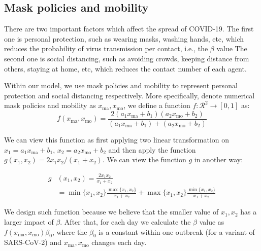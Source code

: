 \subsection{Mask policies and mobility}
There are two important factors which affect the spread of COVID-19. The first one is personal protection, such as wearing masks, washing hands, etc, which reduces the probability of virus transmission per contact, i.e., the $\beta$ value The second one is social distancing, such as avoiding crowds, keeping distance from others, staying at home, etc, which reduces the contact number of each agent.

Within our model, we use mask policies and mobility to represent personal protection and social distancing respectively. More specifically, denote numerical mask policies and mobility as $x_{\text{ma}},x_{\text{mo}}$, we define a function $f:\mathcal{R}^2\rightarrow[0,1]$ as:
\begin{equation}
	f(x_{\text{ma}},x_{\text{mo}})=\frac{2(a_1x_{\text{ma}}+b_1)(a_2x_{\text{mo}}+b_2)}{(a_1x_{\text{ma}}+b_1)+(a_2x_{\text{mo}}+b_2)}
\end{equation}

We can view this function as first applying two linear transformation on $x_1=a_1x_{\text{ma}}+b_1$, $x_2=a_2x_{\text{mo}}+b_2$ and then apply the function $g(x_1,x_2)=2x_1x_2/(x_1+x_2)$. We can view the function $g$ in another way:

\begin{equation}
    \begin{split}
         g&(x_1,x_2)=\frac{2x_1x_2}{x_1+x_2}\\
         &=\min\{x_1,x_2\}\frac{\max\{x_1,x_2\}}{x_1+x_2} + \max\{x_1,x_2\}\frac{\min\{x_1,x_2\}}{x_1+x_2}
    \end{split}
\end{equation}

We design such function because we believe that the smaller value of $x_1,x_2$ has a larger impact of $\beta$. After that, for each day we calculate the $\beta$ value as $f(x_{\text{ma}},x_{\text{mo}})\beta_0$, where the $\beta_0$ is a constant within one outbreak (for a variant of SARS-CoV-2) and $x_{\text{ma}},x_{\text{mo}}$ changes each day.
